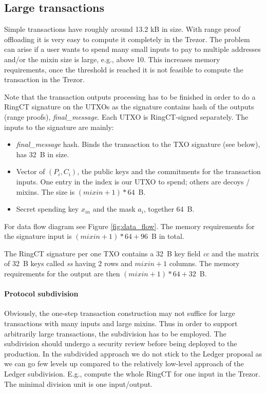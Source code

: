 \documentclass[]{article}
\begin{document}
\subsection{Large transactions}
Simple transactions have roughly around 13.2 kB in size. With range proof offloading it is very easy to compute it completely in the Trezor. The problem can arise if a user wants to spend many small inputs to pay to multiple addresses and/or the mixin size is large, e.g., above 10. This increases memory requirements, once the threshold is reached it is not feasible to compute the transaction in the Trezor.

Note that the transaction outputs processing has to be finished in order to do a RingCT signature on the UTXOs as the signature contains hash of the outputs (range proofs), \emph{final\_message}. Each UTXO is RingCT-signed separately. The inputs to the signature are mainly:

\begin{itemize}
	\item \emph{final\_message} hash. Binds the transaction to the TXO signature (see below), has 32~B in size.
    \item Vector of $(P_i, C_i)$, the public keys and the commitments for the transaction inputs. One entry in the index is our UTXO to spend; others are decoys / mixins. The size is $(mixin+1) * 64$~B.
	\item Secret spending key $x_{in}$ and the mask $a_i$, together 64~B.
\end{itemize}
For data flow diagram see Figure \ref{fig:data_flow}.
The memory requirements for the signature input is $(mixin+1) * 64 + 96$~B in total.

The RingCT signature per one TXO contains a 32~B key field \emph{cc} and the matrix of 32~B keys called \emph{ss} having $2$ rows and $mixin + 1$ columns. The memory requirements for the output are then $(mixin + 1) * 64 + 32$~B.

\paragraph{Protocol subdivision}

Obviously, the one-step transaction construction may not suffice for large transactions with many inputs and large mixins. Thus in order to support arbitrarily large transactions, the subdivision has to be employed. The subdivision should undergo a security review before being deployed to the production. In the subdivided approach we do not stick to the Ledger proposal as we can go few levels up compared to the relatively low-level approach of the Ledger subdivision. E.g., compute the whole RingCT for one input in the Trezor. The minimal division unit is one input/output. 
\end{document}
